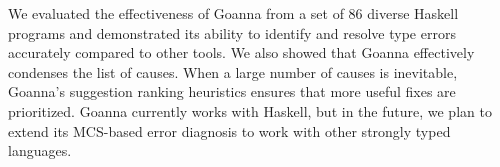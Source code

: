 \documentclass[pdflatex,sn-mathphys-num]{sn-jnl}%
\begin{document}
We evaluated the effectiveness of Goanna from a set of 86 diverse Haskell programs and demonstrated its ability to identify and resolve type errors accurately compared to other tools. We also showed that Goanna effectively condenses the list of causes. When a large number of causes is inevitable, Goanna's suggestion ranking heuristics ensures that more useful fixes are prioritized. Goanna currently works with Haskell, but in the future, we plan to extend its MCS-based error diagnosis to work with other strongly typed languages.


\end{document}
